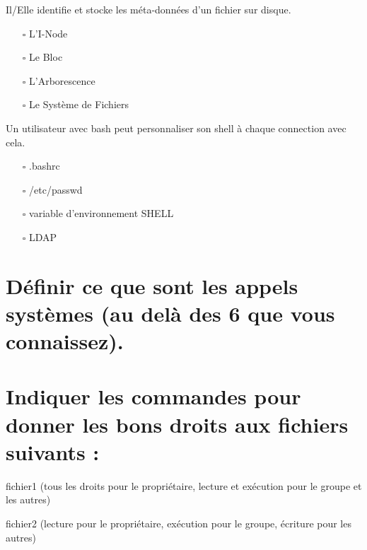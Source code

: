 \documentclass[11pt,a4paper]{article}
\newcommand{\CaseCoche}{\fontsize{20}{20}\selectfont $ \square $}
\begin{document}
\bigskip
\noindent Il/Elle identifie et stocke les méta-données d'un fichier sur disque.\\

\begin{itemize}
\item[\CaseCoche] L'I-Node\\
\item[\CaseCoche] Le Bloc\\
\item[\CaseCoche] L'Arborescence\\
\item[\CaseCoche] Le Système de Fichiers\\
\end{itemize}

\bigskip
\noindent Un utilisateur avec bash peut personnaliser son shell à chaque connection avec cela.\\

\begin{itemize}
\item[\CaseCoche] .bashrc\\
\item[\CaseCoche] /etc/passwd\\
\item[\CaseCoche] variable d'environnement SHELL\\
\item[\CaseCoche] LDAP\\
\end{itemize}

\bigskip

\section{Définir ce que sont les appels systèmes (au delà des 6 que vous connaissez).}

\bigskip
\bigskip
\bigskip
\bigskip
\bigskip
\bigskip
\bigskip
\bigskip
\bigskip

\section{Indiquer les commandes pour donner les bons droits aux fichiers suivants :}

\medskip

\noindent fichier1 (tous les droits pour le propriétaire, lecture et exécution pour le groupe et les autres)

\medskip

\noindent fichier2 (lecture pour le propriétaire, exécution pour le groupe, écriture pour les autres)
\end{document}
